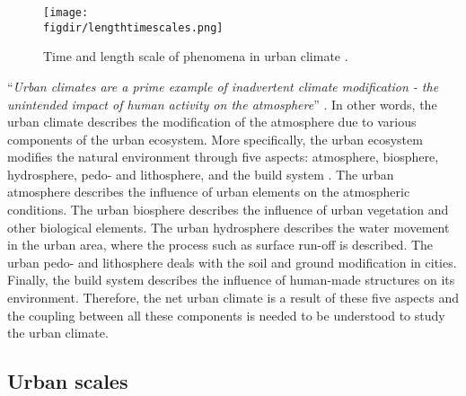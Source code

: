 \begin{figure}[p]
	\centering
	\texttt{[image: \\figdir/lengthtimescales.png]}
	\caption{Time and length scale of phenomena in urban climate \citep{Oke2017a}.}
	\label{fig:lengthtimescales}
\end{figure}


``\textit{Urban climates are a prime example of inadvertent climate modification - the unintended impact of human activity on the atmosphere}'' \citep{Oke2017a}. In other words, the urban climate describes the modification of the atmosphere due to various components of the urban ecosystem. More specifically, the urban ecosystem modifies the natural environment through five aspects: atmosphere, biosphere, hydrosphere, pedo- and lithosphere, and the build system \citep{Oke2017a}. The urban atmosphere describes the influence of urban elements on the atmospheric conditions. The urban biosphere describes the influence of urban vegetation and other biological elements. The urban hydrosphere describes the water movement in the urban area, where the process such as surface run-off is described. The urban pedo- and lithosphere deals with the soil and ground modification in cities. Finally, the build system describes the influence of human-made structures on its environment. Therefore, the net urban climate is a result of these five aspects and the coupling between all these components is needed to be understood to study the urban climate.




\subsection{Urban scales}

